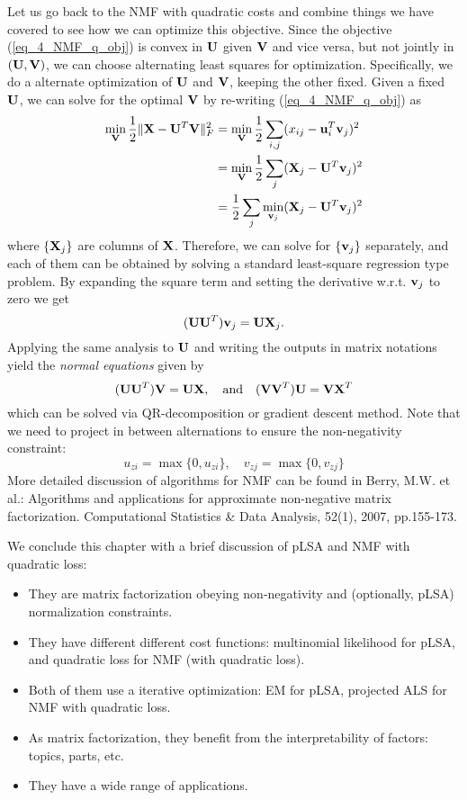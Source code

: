 \documentclass[../main.tex]{subfiles}
\begin{document}
\par Let us go back to the NMF with quadratic costs and combine things we have covered to see how we can optimize this objective. Since the objective (\ref{eq_4_NMF_q_obj}) is convex in ${\bf U}$ given ${\bf V}$ and vice versa, but not jointly in $({\bf U,V})$, we can choose alternating least squares for optimization. Specifically, we do a alternate optimization of ${\bf U}$ and ${\bf V}$, keeping the other fixed. Given a fixed ${\bf U}$, we can solve for the optimal ${\bf V}$ by re-writing (\ref{eq_4_NMF_q_obj}) as
\begin{align*}
\min_{\bf V}\frac{1}{2}\|{\bf X}-{\bf U}^T{\bf V}\|_F^2 &=\min_{\bf V} \frac{1}{2}\sum_{i,j}(x_{ij}-{\bf u}_i^T{\bf v}_j)^2\\
&=\min_{\bf V}\frac{1}{2}\sum_j ({\bf X}_j - {\bf U}^T{\bf v}_j)^2\\
&=\frac{1}{2}\sum_j \min_{{\bf v}_j}({\bf X}_j - {\bf U}^T{\bf v}_j)^2
\end{align*}
where $\{{\bf X}_j\}$ are columns of ${\bf X}$. Therefore, we can solve for $\{{\bf v}_j\}$ separately, and each of them can be obtained by solving a standard least-square regression type problem. By expanding the square term and setting the derivative w.r.t. ${\bf v}_j$ to zero we get
\begin{equation*}
({\bf UU}^T){\bf v}_j = {\bf UX}_j.
\end{equation*}
Applying the same analysis to ${\bf U}$ and writing the outputs in matrix notations yield the \emph{normal equations} given by
\begin{equation*}
({\bf UU}^T){\bf V} = {\bf UX},\quad \text{and}\quad ({\bf VV}^T){\bf U} = {\bf VX}^T
\end{equation*}
which can be solved via QR-decomposition or gradient descent method. Note that we need to project in between alternations to ensure the non-negativity constraint:
\begin{equation*}
u_{zi} = \max\{0,u_{zi}\},\quad v_{zj} = \max\{0, v_{zj}\}
\end{equation*}
More detailed discussion of algorithms for NMF can be found in Berry, M.W. et al.: Algorithms and applications for approximate non-negative matrix factorization. Computational Statistics \& Data Analysis, 52(1), 2007, pp.155-173.
\par We conclude this chapter with a brief discussion of pLSA and NMF with quadratic loss: \begin{itemize}
	\item They are matrix factorization obeying non-negativity and (optionally, pLSA) normalization constraints.
	\item They have different different cost functions: multinomial likelihood for pLSA, and quadratic loss for NMF (with quadratic loss).
	\item Both of them use a iterative optimization: EM for pLSA, projected ALS for NMF with quadratic loss.
	\item As matrix factorization, they benefit from the interpretability of factors: topics, parts, etc.
	\item They have a wide range of applications.
\end{itemize}
\end{document}
